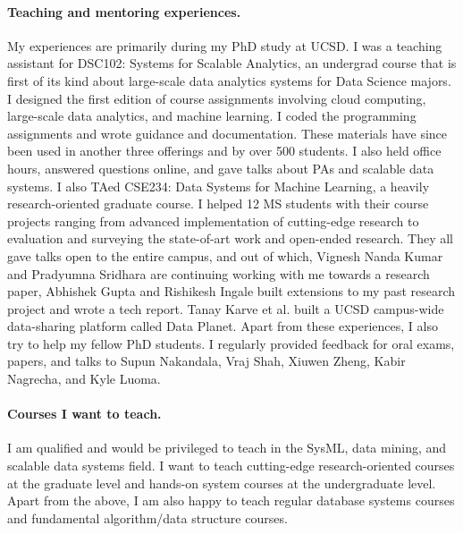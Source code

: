 \documentclass[letterpaper]{article}
\begin{document}
\paragraph{Teaching and mentoring experiences.} My experiences are primarily during my PhD study at UCSD. I was a teaching assistant for DSC102: Systems for Scalable Analytics, an undergrad course that is first of its kind about large-scale data analytics systems for Data Science majors. I designed the first edition of course assignments involving cloud computing, large-scale data analytics, and machine learning. I coded the programming assignments and wrote guidance and documentation. These materials have since been used in another three offerings and by over 500 students. I also held office hours, answered questions online, and gave talks about PAs and scalable data systems. I also TAed CSE234: Data Systems for Machine Learning, a heavily research-oriented graduate course. I helped 12 MS students with their course projects ranging from advanced implementation of cutting-edge research to evaluation and surveying the state-of-art work and open-ended research. They all gave talks open to the entire campus, and out of which, Vignesh Nanda Kumar and Pradyumna Sridhara are continuing working with me towards a research paper, Abhishek Gupta and Rishikesh Ingale built extensions to my past research project and wrote a tech report. Tanay Karve et al. built a UCSD campus-wide data-sharing platform called Data Planet. Apart from these experiences, I also try to help my fellow PhD students. I regularly provided feedback for oral exams, papers, and talks to Supun Nakandala, Vraj Shah, Xiuwen Zheng, Kabir Nagrecha, and Kyle Luoma.

\paragraph{Courses I want to teach.} I am qualified and would be privileged to teach in the SysML, data mining, and scalable data systems field. I want to teach cutting-edge research-oriented courses at the graduate level and hands-on system courses at the undergraduate level. Apart from the above, I am also happy to teach regular database systems courses and fundamental algorithm/data structure courses.



%
%
\end{document}
